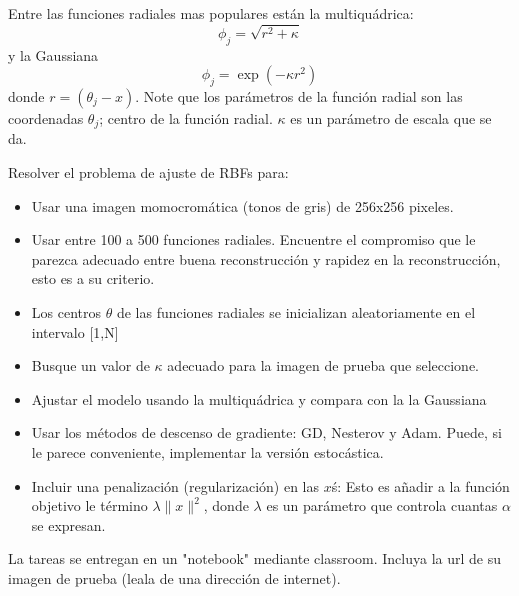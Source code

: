 \documentclass{article}
\begin{document}
Entre las funciones radiales mas populares están la multiquádrica:
\begin{equation}
    \label{eq:M1}
    \phi_j = \sqrt{r^2  + \kappa }
\end{equation}
y la Gaussiana
\begin{equation}
    \label{eq:MQ}
    \phi_j = \exp{(-\kappa r^2)}
\end{equation}
donde $r = (\theta_{j} - x).$ Note que los parámetros de la función radial son las coordenadas $\theta_j$; centro de la función radial. $\kappa$ es un parámetro de escala que se da.

Resolver el problema de ajuste de RBFs para:

\begin{itemize}
    \item Usar una imagen momocromática (tonos de gris) de 256x256 pixeles.

    \item Usar entre 100 a 500 funciones radiales. Encuentre el compromiso que le parezca adecuado entre buena reconstrucción y rapidez en la reconstrucción, esto es a su criterio.

    \item Los centros $\theta$ de las funciones radiales se inicializan aleatoriamente en el intervalo [1,N]


    \item Busque un valor de $\kappa$ adecuado para la imagen de prueba que seleccione.
     
    \item Ajustar el modelo usando la multiquádrica y compara con la la Gaussiana

    \item Usar los métodos de descenso de gradiente: GD, Nesterov y Adam. Puede, si le parece conveniente, implementar la versión estocástica.

    \item Incluir una penalización (regularización) en las $x$\'s: Esto es añadir a la función objetivo le término $\lambda \|x\|^2$, donde $\lambda$ es un parámetro que controla cuantas $\alpha$ se expresan.    

\end{itemize}


{\bf} La tareas se entregan en un "notebook" mediante classroom. Incluya la url de su imagen de prueba (leala de una dirección de internet).
\end{document}
